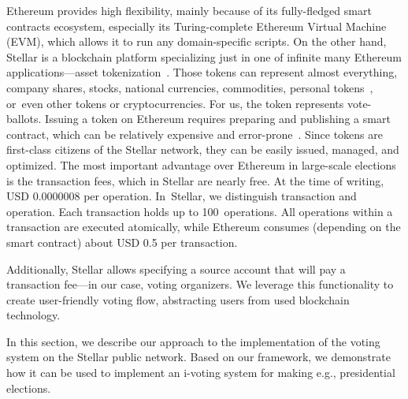 \documentclass[applsci,article,accept,moreauthors,pdftex]{Definitions/mdpi}
\begin{document}
Ethereum provides high flexibility, mainly because of its fully-fledged smart contracts ecosystem, especially its Turing-complete Ethereum Virtual Machine (EVM), which allows it to run any domain-specific scripts. 
On the other hand, Stellar is a blockchain platform specializing just in one of infinite many Ethereum applications––asset tokenization~\cite{li2019tokenization}. Those tokens can represent almost everything, company shares, stocks, national currencies, commodities, personal tokens~\cite{Personal27:online}, or~even other tokens or cryptocurrencies. For us, the token represents vote-ballots. 
Issuing a token on Ethereum requires preparing and publishing a smart contract, which can be relatively expensive and error-prone~\cite{Analysis57:online}.
Since tokens are first-class citizens of the Stellar network, they can be easily issued, managed, and optimized. The most important advantage over Ethereum in large-scale elections is the transaction fees, which in Stellar are nearly free. At the time of writing, USD 0.0000008 per operation. In~Stellar, we distinguish transaction and operation. Each transaction   holds up to 100~operations. All operations within a transaction are executed atomically, while Ethereum consumes (depending on the smart contract) about USD 0.5 per transaction. %

Additionally, Stellar allows specifying a source account that will pay a transaction fee––in our case, voting organizers. We leverage this functionality to create user-friendly voting flow, abstracting users from used blockchain technology.

In this section, we describe our approach to the implementation of the voting system on the Stellar public network. Based on our framework, we demonstrate how it can be used to implement an i-voting system
for making e.g., presidential elections. %
\end{document}
